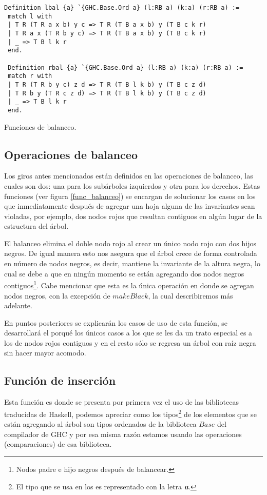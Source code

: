 \begin{listing}[!ht]
\centering
\captionsetup{justification=centering}
\begin{verbatim}
Definition lbal {a} `{GHC.Base.Ord a} (l:RB a) (k:a) (r:RB a) :=
 match l with
 | T R (T R a x b) y c => T R (T B a x b) y (T B c k r)
 | T R a x (T R b y c) => T R (T B a x b) y (T B c k r)
 | _ => T B l k r
 end.

 Definition rbal {a} `{GHC.Base.Ord a} (l:RB a) (k:a) (r:RB a) :=
 match r with
 | T R (T R b y c) z d => T R (T B l k b) y (T B c z d)
 | T R b y (T R c z d) => T R (T B l k b) y (T B c z d)
 | _ => T B l k r
 end.
\end{verbatim}
\caption{Funciones de balanceo.}
\label{func_balanceo}
\end{listing}

\subsection{Operaciones de balanceo}
Los giros antes mencionados están definidos en las operaciones de balanceo, las cuales son dos: una 
para los subárboles izquierdos y otra para los derechos. Estas funciones (ver figura 
\ref{func_balanceo}) se encargan de solucionar los casos en los que inmediatamente después de 
agregar una hoja alguna de las invariantes sean violadas, por ejemplo, dos nodos rojos que resultan 
contiguos en algún lugar de la estructura del \'arbol.

El balanceo elimina el doble nodo rojo al crear un \'unico nodo rojo con dos hijos negros. De 
igual manera esto nos asegura que el árbol crece de forma controlada en n\'umero de nodos negros, es
decir, mantiene la invariante de la altura negra, lo cual se debe a que en ningún momento se están 
agregando dos nodos negros contiguos\footnote{Nodos padre e hijo negros después de balancear.}. Cabe
 mencionar que esta es la única operación en donde se agregan nodos negros, con la excepción de 
 \hyperref[raiz_negra_func]{$makeBlack$}, la cual describiremos m\'as adelante.

En puntos posteriores se explicar\'an los casos de uso de esta función, se desarrollar\'a el 
porqu\'e los \'unicos casos a los que se les da un trato especial es a los de nodos rojos contiguos
y en el resto s\'olo se regresa un \'arbol con ra\'iz negra sin hacer mayor acomodo.

\subsection {Funci\'on de inserci\'on}
Esta funci\'on es donde se presenta por primera vez el uso de las bibliotecas traducidas de
Haskell, podemos apreciar como los tipos\footnote{El tipo que se usa en los {\arns} es representado 
con la letra \textbf{\textit{a}}.} de los elementos que se est\'an agregando al \'arbol son tipos
ordenados de la biblioteca $Base$ del compilador de GHC y por esa misma raz\'on estamos usando las
operaciones (comparaciones) de esa biblioteca.

